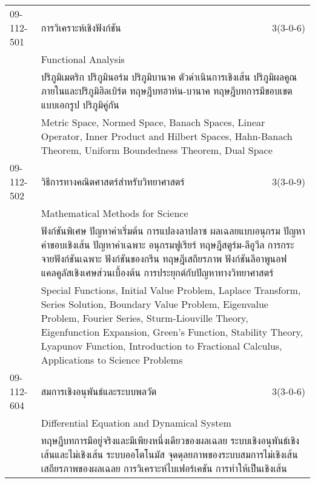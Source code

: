 \begin{longtable}{p{}p{}r{}}
09-112-501 & การวิเคราะห์เชิงฟังก์ชัน & 3(3-0-6)\\*
 & Functional Analysis & \phantom{x} \vspace{3mm} \\*
&  \multicolumn{2}{p{0.75\textwidth}}{ปริภูมิเมตริก ปริภูมินอร์ม ปริภูมิบานาค ตัวดำเนินการเชิงเส้น ปริภูมิผลคูณภายในและปริภูมิฮิลเบิร์ต ทฤษฎีบทฮาห์น-บานาค ทฤษฎีบทการมีขอบเขตแบบเอกรูป ปริภูมิคู่กัน} \vspace{3mm} \\*
&  \multicolumn{2}{p{0.75\textwidth}}{Metric Space, Normed Space, Banach Spaces, Linear Operator, Inner Product and Hilbert Spaces, Hahn-Banach Theorem, Uniform Boundedness Theorem, Dual Space} \vspace{8mm} \\*
09-112-502 & วิธีการทางคณิตศาสตร์สำหรับวิทยาศาสตร์ & 3(3-0-9)\\*
 & Mathematical Methods for Science & \phantom{x} \vspace{3mm} \\*
&  \multicolumn{2}{p{0.75\textwidth}}{ฟังก์ชันพิเศษ ปัญหาค่าเริ่มต้น การแปลงลาปลาซ ผลเฉลยแบบอนุกรม ปัญหาค่าขอบเชิงเส้น ปัญหาค่าเฉพาะ อนุกรมฟูเรียร์ ทฤษฎีสตูร์ม-ลีอูวีล การกระจายฟังก์ชันเฉพาะ ฟังก์ชันของกรีน ทฤษฎีเสถียรภาพ ฟังก์ชันลีอาพูนอฟ แคลคูลัสเชิงเศษส่วนเบื้องต้น การประยุกต์กับปัญหาทางวิทยาศาสตร์} \vspace{3mm} \\*
&  \multicolumn{2}{p{0.75\textwidth}}{Special Functions, Initial Value Problem, Laplace Transform, Series Solution, Boundary Value Problem, Eigenvalue Problem, Fourier Series, Sturm-Liouville Theory, Eigenfunction Expansion, Green’s Function, Stability Theory, Lyapunov Function, Introduction to Fractional Calculus, Applications to Science Problems} \vspace{8mm} \\*
09-112-604 & สมการเชิงอนุพันธ์และระบบพลวัต & 3(3-0-6)\\*
 & Differential Equation and Dynamical System & \phantom{x} \vspace{3mm} \\*
&  \multicolumn{2}{p{0.75\textwidth}}{ทฤษฎีบทการมีอยู่จริงและมีเพียงหนึ่งเดียวของผลเฉลย ระบบเชิงอนุพันธ์เชิงเส้นและไม่เชิงเส้น ระบบออโตโนมัส จุดดุลยภาพของระบบสมการไม่เชิงเส้น เสถียรภาพของผลเฉลย การวิเคราะห์ไบเฟอร์เคชัน การทำให้เป็นเชิงเส้น} \vspace{3mm} \\*

\end{longtable}
